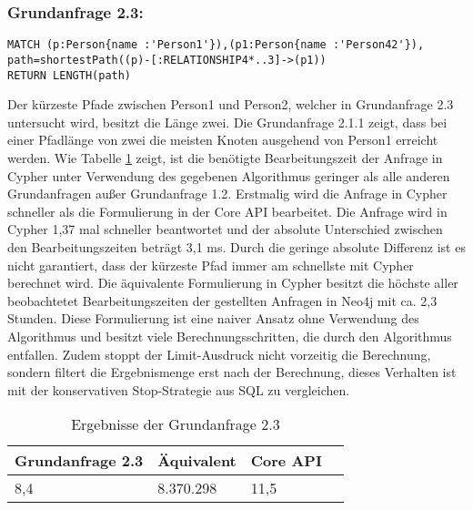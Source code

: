 \subsubsection{Grundanfrage 2.3:}
\begin{Verbatim}[frame=single]
MATCH (p:Person{name :'Person1'}),(p1:Person{name :'Person42'}),
path=shortestPath((p)-[:RELATIONSHIP4*..3]->(p1)) 
RETURN LENGTH(path)
\end{Verbatim} 
  Der kürzeste Pfade zwischen Person1 und Person2, welcher in Grundanfrage 2.3 untersucht wird, besitzt die Länge zwei. Die Grundanfrage 2.1.1 zeigt, dass bei einer Pfadlänge von zwei die meisten Knoten ausgehend von Person1 erreicht werden. Wie Tabelle \ref{tab:Query2_3} zeigt, ist die benötigte Bearbeitungszeit der Anfrage in Cypher unter Verwendung des gegebenen Algorithmus geringer als alle anderen Grundanfragen außer Grundanfrage 1.2. Erstmalig wird die Anfrage in Cypher schneller als die Formulierung in der Core API bearbeitet. Die Anfrage wird in Cypher 1,37 mal schneller beantwortet und  der absolute Unterschied zwischen den Bearbeitungszeiten beträgt 3,1 ms. Durch die geringe absolute Differenz ist es nicht garantiert, dass der kürzeste Pfad immer am schnellste mit Cypher berechnet wird. \newline
Die äquivalente Formulierung in Cypher besitzt die höchste aller beobachtetet Bearbeitungszeiten der gestellten Anfragen in Neo4j mit ca. 2,3 Stunden. Diese Formulierung ist eine naiver Ansatz ohne Verwendung des Algorithmus und besitzt viele Berechnungsschritten, die durch den Algorithmus entfallen. Zudem stoppt der Limit-Ausdruck nicht vorzeitig die Berechnung, sondern filtert die Ergebnismenge erst nach der Berechnung, dieses Verhalten ist mit der konservativen Stop-Strategie aus SQL zu vergleichen\parencite{carey1997saying}.   
\FloatBarrier
\begin{table}[!htb]
	\centering
		\begin{tabular}{ |p{3cm}|p{3cm}|p{3cm}|p{3cm}|  }
			\hline
			Grundanfrage 2.3 & Äquivalent&Core API\\
			\hline
			8,4    & 8.370.298 &  11,5\\
			\hline
		\end{tabular}
		\caption{Ergebnisse der Grundanfrage 2.3}
		\label{tab:Query2_3}
\end{table}
\FloatBarrier
